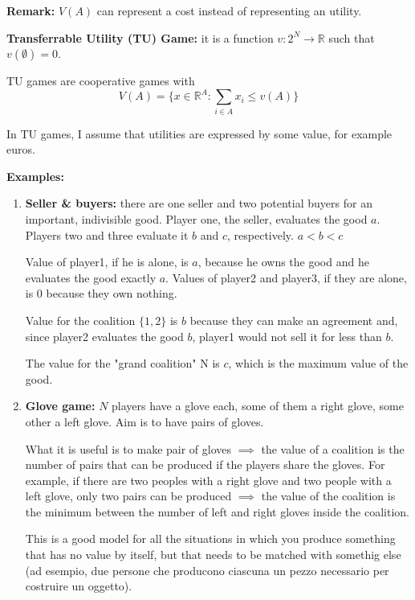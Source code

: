 \noindent \textbf{Remark:} $V(A)$ can represent a cost instead of representing an utility.

\bigskip
\noindent \textbf{Transferrable Utility (TU) Game:} it is a function 
$v: 2^N \rightarrow \mathbb{R}$ such that $v(\emptyset) = 0$.

\bigskip
\noindent TU games are cooperative games with
\[
	V(A) = \{x \in \mathbb{R}^A: \sum_{i \in A}{x_i} \leq v(A)\}
\] 

\noindent In TU games, I assume that utilities are expressed by some value, 
for example euros.

\bigskip
\noindent \textbf{Examples:}
\begin{enumerate}
	\item \textbf{Seller \& buyers:} there are one seller and two potential buyers for an important, indivisible good. Player one, the seller, evaluates the good $a$. Players two and three evaluate it $b$ and $c$, respectively. $a < b < c$

	\noindent Value of player1, if he is alone, is $a$, because he owns the 
	good and he evaluates the good exactly $a$. Values of player2 and player3, 
	if they are alone, is 0 because they own nothing.
	
	\noindent Value for the coalition $\{1,2\}$ is $b$ because they can make an 
	agreement and, since player2 evaluates the good $b$, player1 would not 
	sell it for less than $b$.
	
	\noindent The value for the "grand coalition" N is $c$, which is the maximum 
	value of the good.

	\item \textbf{Glove game:} $N$ players have a glove each, some of them a right glove, some other a left glove. Aim is to have pairs of gloves.

	\noindent What it is useful is to make pair of gloves $\implies$ the value of a 
	coalition is the number of pairs that can be produced if the players share 
	the gloves. For example, if there are two peoples with a right glove and 
	two people with a left glove, only two pairs can be produced $\implies$ the value 
	of the coalition is the minimum between the number of left and right gloves 
	inside the coalition.
	
	\noindent This is a good model for all the situations in which you produce 
	something that has no value by itself, but that needs to be matched with 
	somethig else (ad esempio, due persone che producono ciascuna un pezzo 
	necessario per costruire un oggetto).
	

\end{enumerate}
